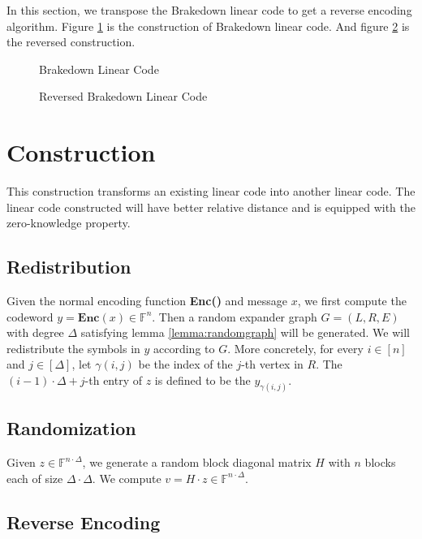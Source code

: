 In this section, we transpose the Brakedown linear code to get a reverse encoding algorithm. Figure \ref{fig:lc} is the construction of Brakedown linear code. And figure \ref{fig:lc-rev} is the reversed construction.


\begin{figure}[h]
\centering

\caption{Brakedown Linear Code}
\label{fig:lc}
\end{figure}



\begin{figure}[h]
\centering

\caption{Reversed Brakedown Linear Code}
\label{fig:lc-rev}
\end{figure}


\section{Construction}

This construction transforms an existing linear code into another linear code. The linear code constructed will have better relative distance and is equipped with the zero-knowledge property.

\subsection{Redistribution}

Given the normal encoding function \textbf{Enc()} and message $x$, we first compute the codeword $y = \textbf{Enc}(x) \in \mathbb{F}^n$. Then a random expander graph $G = (L, R, E)$ with degree $\Delta$ satisfying lemma \ref{lemma:randomgraph} will be generated. We will redistribute the symbols in $y$ according to $G$. More concretely, for every $i \in [n]$ and $j \in [\Delta]$, let $\gamma(i, j)$ be the index of the $j$-th vertex in $R$. The $(i - 1) \cdot \Delta + j$-th entry of $z$ is defined to be the $y_{\gamma(i, j)}$.

\subsection{Randomization}

Given $z \in \mathbb{F}^{n \cdot \Delta}$, we generate a random block diagonal matrix $H$ with $n$ blocks each of size $\Delta \cdot \Delta$. We compute $v = H \cdot z \in \mathbb{F}^{n \cdot \Delta}$.

\subsection{Reverse Encoding}

